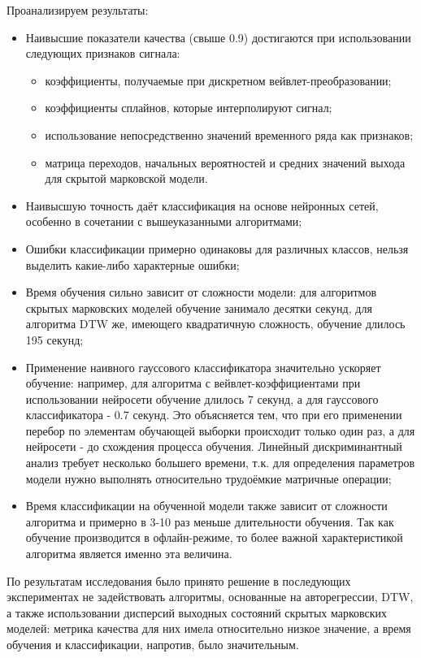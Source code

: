 Проанализируем результаты:
\begin{itemize}
\item Наивысшие показатели качества (свыше 0.9) достигаются при использовании следующих признаков сигнала:  
  \begin{itemize}
  \item коэффициенты, получаемые при дискретном вейвлет-преобразовании;
  \item коэффициенты сплайнов, которые интерполируют сигнал;
  \item использование непосредственно значений временного ряда как признаков;
  \item матрица переходов, начальных вероятностей и средних значений выхода для скрытой марковской модели.
  \end{itemize}
\item Наивысшую точность даёт классификация на основе нейронных сетей, особенно в сочетании с вышеуказанными алгоритмами;
\item Ошибки классификации примерно одинаковы для различных классов, нельзя выделить какие-либо характерные ошибки;
\item Время обучения сильно зависит от сложности модели: для алгоритмов скрытых марковских моделей обучение занимало десятки секунд, для алгоритма DTW же, имеющего квадратичную сложность, обучение длилось 195 секунд;
\item Применение наивного гауссового классификатора значительно ускоряет обучение: например, для алгоритма с вейвлет-коэффициентами при использовании нейросети обучение длилось 7 секунд, а для гауссового классификатора - 0.7 секунд. Это объясняется тем, что при его применении перебор по элементам обучающей выборки происходит только один раз, а для нейросети - до схождения процесса обучения. Линейный дискриминантный анализ требует несколько большего времени, т.к. для определения параметров модели нужно выполнять относительно трудоёмкие матричные операции;
\item Время классификации на обученной модели также зависит от сложности алгоритма и примерно в 3-10 раз меньше длительности обучения. Так как обучение производится в офлайн-режиме, то более важной характеристикой алгоритма является именно эта величина.
\end{itemize}

По результатам исследования было принято решение в последующих экспериментах не задействовать алгоритмы, основанные на авторегрессии, DTW, а также использовании дисперсий выходных состояний скрытых марковских моделей: метрика качества для них имела относительно низкое значение, а время обучения и классификации, напротив, было значительным.

